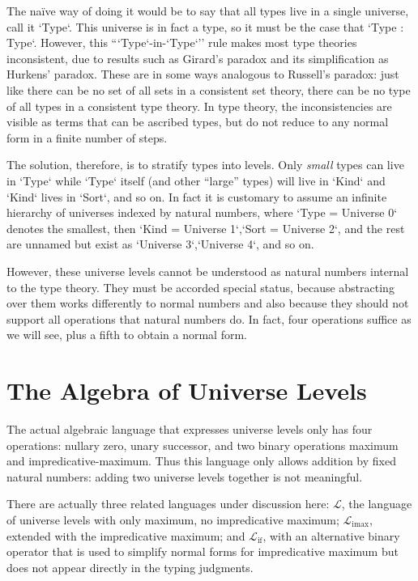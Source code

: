 \documentclass[11pt, twoside, reqno]{book}
\DeclareMathOperator{\imax}{imax}
\DeclareMathOperator{\ifop}{if}
\begin{document}
The na\" ive way of doing it would be to say that all types live in a single universe, call it \inHS`Type`.
This universe is in fact a type, so it must be the case that \inHS`Type : Type`.
However, this ``\inHS`Type`-in-\inHS`Type`'' rule makes most type theories inconsistent, due to results such as Girard's paradox and its simplification as Hurkens' paradox.
These are in some ways analogous to Russell's paradox: just like there can be no set of all sets in a consistent set theory, there can be no type of all types in a consistent type theory.
In type theory, the inconsistencies are visible as terms that can be ascribed types, but do not reduce to any normal form in a finite number of steps.

The solution, therefore, is to stratify types into levels.
Only \emph{small} types can live in \inHS`Type` while \inHS`Type` itself (and other ``large'' types) will live in \inHS`Kind` and \inHS`Kind` lives in \inHS`Sort`, and so on.
In fact it is customary to assume an infinite hierarchy of universes indexed by natural numbers, where \inHS`Type = Universe 0` denotes the smallest, then \inHS`Kind = Universe 1`,\enskip\inHS`Sort = Universe 2`, and the rest are unnamed but exist as \inHS`Universe 3`,\enskip\inHS`Universe 4`, and so on.

However, these universe levels cannot be understood as natural numbers internal to the type theory.
They must be accorded special status, because abstracting over them works differently to normal numbers and also because they should not support all operations that natural numbers do.
In fact, four operations suffice as we will see, plus a fifth to obtain a normal form.

\section{The Algebra of Universe Levels}
\label{alg-uni-lvl}

The actual algebraic language that expresses universe levels only has four operations: nullary zero, unary successor, and two binary operations maximum and impredicative-maximum.
Thus this language only allows addition by fixed natural numbers: adding two universe levels together is not meaningful.

There are actually three related languages under discussion here: $\mathcal{L}$, the language of universe levels with only maximum, no impredicative maximum; $\mathcal{L}_{\imax}$, extended with the impredicative maximum; and $\mathcal{L}_{\ifop}$, with an alternative binary operator that is used to simplify normal forms for impredicative maximum but does not appear directly in the typing judgments.
\end{document}
